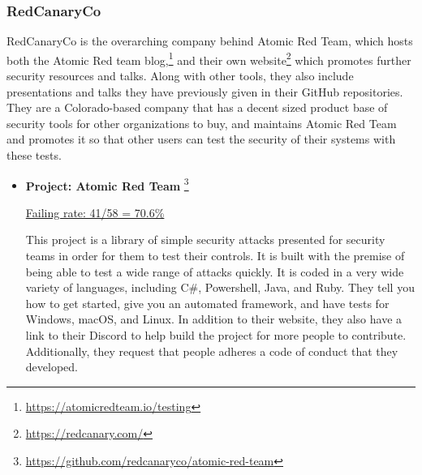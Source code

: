 \documentclass[]{acmart}
\begin{document}
\subsubsection{RedCanaryCo}
RedCanaryCo is the overarching company behind Atomic Red Team, which hosts both the Atomic Red team blog,\footnote{\url{https://atomicredteam.io/testing}} and their own website\footnote{\url{https://redcanary.com/}} which promotes further security resources and talks. Along with other tools, they also include presentations and talks they have previously given in their GitHub repositories. They are a Colorado-based company that has a decent sized product base of security tools for other organizations to buy, and maintains Atomic Red Team and promotes it so that other users can test the security of their systems with these tests.
\begin{itemize}
    \item { \bf Project: Atomic Red Team }\footnote{\url{https://github.com/redcanaryco/atomic-red-team}} 
    
    \underline{ Failing rate: 41/58 = 70.6\% }
    
    This project is a library of simple security attacks presented for security teams in order for them to test their controls. It is built with the premise of being able to test a wide range of attacks quickly. It is coded in a very wide variety of languages, including C\#, Powershell, Java, and Ruby. They tell you how to get started, give you an automated framework, and have tests for Windows, macOS, and Linux. In addition to their website, they also have a link to their Discord to help build the project for more people to contribute. Additionally, they request that people adheres a code of conduct that they developed. 
\end{itemize}
\end{document}
